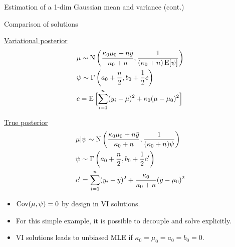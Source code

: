 \begin{frame}{Estimation of a 1-dim Gaussian mean and variance (cont.)}
\end{frame}

\begin{frame}{Comparison of solutions}
  
  {\centering
  \begin{minipage}{0.45\linewidth}
    \underline{Variational posterior}
    {\small
    \begin{align*}
      &\mu \sim \N \left(\frac{\kappa_0 \mu_0 + n\bar y}{\kappa_0 + n}, \frac{1}{(\kappa_0 + n)\E[\psi]} \right) \\
      &\psi \sim \Gamma\left(a_0 + \half[n], b_0 + \half c\right) \\
      &c = \E\Big[ {\sum_{i=1}^n} (y_i - \mu)^2 + \kappa_0(\mu - \mu_0)^2 \Big]
    \end{align*}}
  \end{minipage}
  \hspace{6mm}
  \begin{minipage}{0.45\linewidth}
    \underline{True posterior}
    {\small
    \begin{align*}
      &\mu|\psi \sim \N \left(\frac{\kappa_0 \mu_0 + n\bar y}{\kappa_0 + n}, \frac{1}{(\kappa_0 + n)\psi} \right) \\
      &\psi \sim \Gamma\left(a_0 + \half[n], b_0 + \half c' \right) \\
      &c' = {\sum_{i=1}^n} (y_i - \bar y)^2 + \frac{\kappa_0}{\kappa_0 + n}(\bar y - \mu_0)^2
    \end{align*}}    
  \end{minipage}}
  
  \begin{itemize}
    \item $\Cov(\mu,\psi) = 0$ by design in VI solutions.
    \item For this simple example, it is possible to decouple and solve explicitly.
    \item VI solutions leads to unbiased MLE if $\kappa_0 = \mu_0 = a_0 = b_0 = 0$.
  \end{itemize}
\end{frame}



